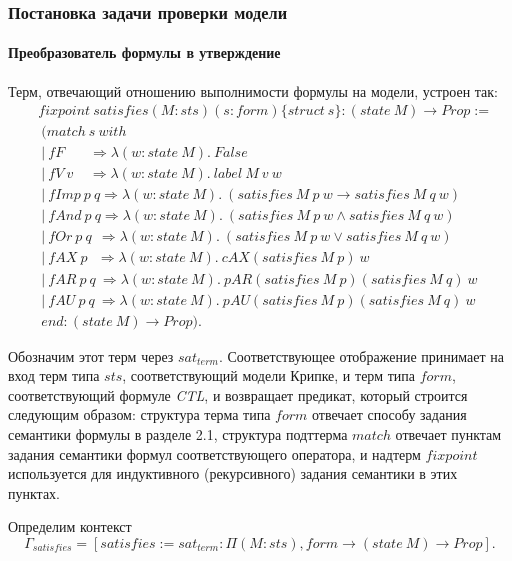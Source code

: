 \documentclass[12pt]{article}
\begin{document}
\subsubsection{Постановка задачи проверки модели}
\paragraph{Преобразователь формулы в утверждение}\mbox{}

Терм, отвечающий отношению выполнимости формулы на модели, устроен так:
\begin{align*}
& fixpoint\ satisfies (M : sts) (s : form)\{struct\ s\}: (state\ M) \xrightarrow{} Prop := \\
&\  (match\ s\ with \\
&\ |\ fF \ \ \ \ \ \ \ \     \Rightarrow \lambda (w : state\ M).\ False\\
&\ |\ fV\ v \ \ \ \ \    \Rightarrow \lambda (w : state\ M).\ label\ M\ v\ w \\
&\ |\ fImp\ p\ q \Rightarrow \lambda (w : state\ M).\ (satisfies\ M\ p\ w \xrightarrow{} satisfies\ M\ q\ w) \\
&\ |\ fAnd\ p\ q \Rightarrow \lambda (w : state\ M).\ (satisfies\ M\ p\ w \wedge satisfies\ M\ q\ w) \\
&\ |\ fOr\ p\ q \ \ \Rightarrow \lambda (w : state\ M).\ (satisfies\ M\ p\ w \vee satisfies\ M\ q\ w) \\
&\ |\ fAX\ p \ \ \   \Rightarrow \lambda (w : state\ M).\ cAX (satisfies\ M\ p)\ w \\
&\ |\ fAR\ p\ q \ \Rightarrow \lambda (w : state\ M).\ pAR (satisfies\ M\ p) (satisfies\ M\ q)\ w \\
&\ |\ fAU\ p\ q \ \Rightarrow \lambda (w : state\ M).\ pAU (satisfies\ M\ p) (satisfies\ M\ q)\ w \\
&\ end: (state\ M) \xrightarrow{} Prop ).
\end{align*}

Обозначим этот терм через $sat_{term}$. 
Соответствующее отображение принимает на вход терм типа $sts$, соответствующий модели Крипке, и терм типа $form$, соответствующий формуле \textit{CTL}, и возвращает предикат, который строится следующим образом: структура терма типа $form$ отвечает способу задания семантики формулы в разделе 2.1, структура подттерма $match$ отвечает пунктам задания семантики формул соответствующего оператора, и надтерм $fixpoint$ используется для индуктивного (рекурсивного) задания семантики в этих пунктах.

Определим контекст 
$$\Gamma_{satisfies}=[satisfies:=sat_{term}:\Pi(M : sts), form \xrightarrow{} (state\ M) \xrightarrow{} Prop].$$
\end{document}

